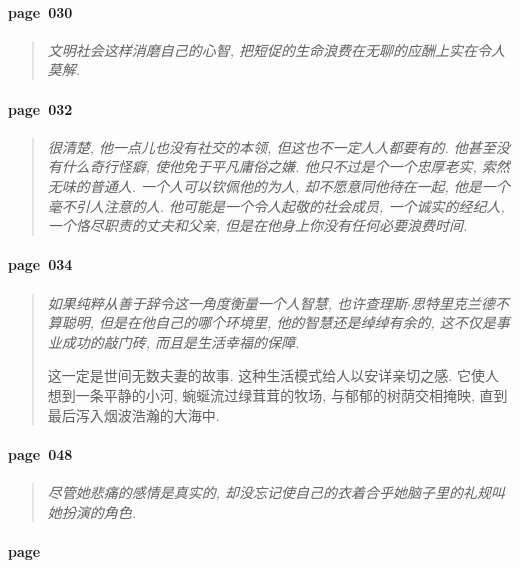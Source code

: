 \paragraph*{page~030}
\begin{quotation}
    \itshape
    文明社会这样消磨自己的心智, 把短促的生命浪费在无聊的应酬上实在令人莫解.
\end{quotation}

\paragraph*{page~032}
\begin{quotation}
    \itshape
    很清楚, 他一点儿也没有社交的本领, 但这也不一定人人都要有的. 他甚至没有什么奇行怪癖, 使他免于平凡庸俗之嫌. 他只不过是个一个忠厚老实, 索然无味的普通人. 一个人可以钦佩他的为人, 却不愿意同他待在一起, 他是一个毫不引人注意的人. 他可能是一个令人起敬的社会成员, 一个诚实的经纪人, 一个恪尽职责的丈夫和父亲, 但是在他身上你没有任何必要浪费时间.
\end{quotation}

\paragraph*{page~034}
\begin{quotation}
    \itshape
    如果纯粹从善于辞令这一角度衡量一个人智慧, 也许查理斯$\cdot$思特里克兰德不算聪明, 但是在他自己的哪个环境里, 他的智慧还是绰绰有余的, 这不仅是事业成功的敲门砖, 而且是生活幸福的保障.

    这一定是世间无数夫妻的故事. 这种生活模式给人以安详亲切之感. 它使人想到一条平静的小河, 蜿蜒流过绿茸茸的牧场, 与郁郁的树荫交相掩映, 直到最后泻入烟波浩瀚的大海中. 
\end{quotation}

\paragraph*{page~048}
\begin{quotation}
    \itshape
    尽管她悲痛的感情是真实的, 却没忘记使自己的衣着合乎她脑子里的礼规叫她扮演的角色. 
\end{quotation}

\paragraph*{page~}
\begin{quotation}
    \itshape
    
\end{quotation}

